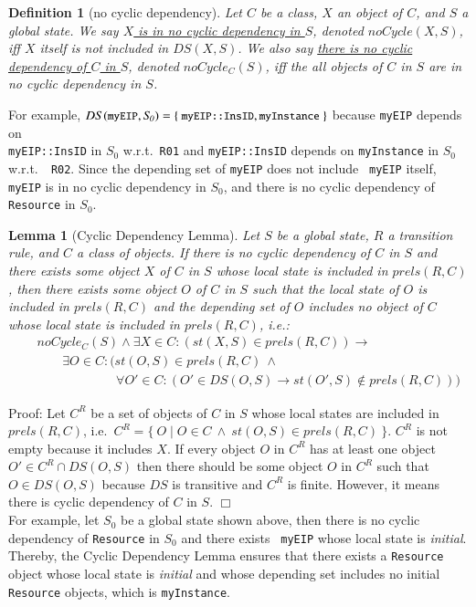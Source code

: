 \documentclass[12pt]{report}
\newtheorem{lemma}{Lemma}
\newtheorem{definition}{Definition}
\newcommand{\ra}{\rightarrow}
\newcommand{\mbstt}[1]{\mbox{\small{\tt {#1}}}}
\newcommand{\stt}[1]{{\small{\tt {#1}}}}
\newcommand{\ul}{\underline}
\begin{document}
\begin{definition}[no cyclic dependency]
Let $C$ be a class, $X$ an object of $C$, and $S$ a global
state. We say \ul{$X$ is in no cyclic dependency in $S$}\!, denoted
\ul{$noCycle(X,S)$}, iff $X$ itself is not included in $DS(X,S)$. We
also say \ul{there is no cyclic dependency of $C$ in $S$}\!, denoted
\ul{$noCycle_C(S)$}, iff the all objects of $C$ in $S$ are in no cyclic
dependency in $S$\!.
\end{definition}
For example, $DS(\mbstt{myEIP},\mathit{S_0}) =
\{~\mbstt{myEIP::InsID},\mbstt{myInstance}~\}$ because {\tt myEIP}
depends on\\ \stt{myEIP::InsID} in $\mathit{S_0}$ w.r.t.\ {\tt R01} and
\stt{myEIP::InsID} depends on {\tt myInstance} in $\mathit{S_0}$ w.r.t.\ {\tt
  R02}. Since the depending set of {\tt myEIP} does not include {\tt
  myEIP} itself, {\tt myEIP} is in no cyclic dependency in $\mathit{S_0}$, and
there is no cyclic dependency of {\tt Resource} in $\mathit{S_0}$.
\begin{lemma}[Cyclic Dependency Lemma]
Let $S$ be a global state, $R$ a transition rule, and $C$ a
class of objects. If there is no cyclic dependency of $C$ in $S$
and there exists some object $X$ of $C$ in $S$ whose local state
is included in $prels(R,C)$, then there exists some object $O$ of $C$ in
$S$ such that the local state of $O$ is included in $prels(R,C)$ and the
depending set of $O$ includes no object of $C$ whose local
state is included in $prels(R,C)$, i.e.:
\begin{eqnarray*}
&&noCycle_C(S)\land\exists X\in C:(st(X,S)\in prels(R,C)) \ra\\
&&\:\:\:\:\:\:\:\:\:\exists O\in C:(st(O,S)\in prels(R,C)\ \land\\
&&\:\:\:\:\:\:\:\:\:\:\:\:\:\:\:\:\:\:\:\:\:\:\:\:\:\:\:\:
\forall O'\in C:(O'\in DS(O,S)\ra st(O',S)\not\in prels(R,C)))
\end{eqnarray*}
\end{lemma}
Proof: Let $C^R$ be a set of objects of $C$ in $S$ whose local states
are included in $prels(R,C)$, i.e.\ $C^R=\{~O\mid O\in C~\land~
st(O,S)\in prels(R,C)~\}$. $C^R$ is not empty because it includes $X$.
If every object $O$ in $C^R$ has at least one object $O' \in C^R\cap
DS(O,S)$ then there should be some object $O$ in $C^R$ such that $O
\in DS(O,S)$ because $DS$ is transitive and $C^R$ is finite. However,
it means there is cyclic dependency of $C$ in $S$\!. $\Box$\\

\noindent
For example, let $\mathit{S_0}$ be a global state shown above, then there is no
cyclic dependency of {\tt Resource} in $\mathit{S_0}$ and there exists {\tt
  myEIP} whose local state is {\it initial}. Thereby, the Cyclic
Dependency Lemma ensures that there exists a {\tt Resource} object
whose local state is {\it initial} and whose depending set includes no
initial {\tt Resource} objects, which is {\tt myInstance}.
\end{document}
